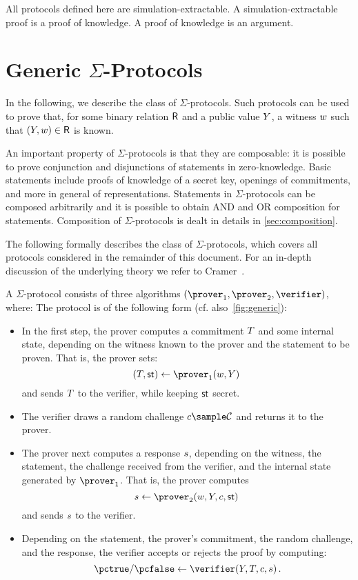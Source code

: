 \documentclass[runningheads,11pt]{article}
\begin{document}
All protocols defined here are simulation-extractable. A simulation-extractable proof is a proof of knowledge. A proof of knowledge is an argument.


\section{Generic $\Sigma$-Protocols}
In the following, we describe the class of $\Sigma$-protocols.
Such protocols can be used to prove that, for some binary relation $\mathsf{R}$ and a public value $Y$, a witness $w$ such that $(Y,w)\in\mathsf{R}$ is known.

\medskip

An important property of $\Sigma$-protocols is that they are composable: it is possible to prove conjunction and disjunctions of statements in zero-knowledge. Basic statements include proofs of knowledge of a secret key, openings of commitments, and more in general of representations.
Statements in $\Sigma$-protocols can be composed arbitrarily and it is possible to obtain \textsf{AND} and \textsf{OR} composition for statements.
Composition of $\Sigma$-protocols is dealt in details in \cref{sec:composition}.

The following formally describes the class of $\Sigma$-protocols, which covers all protocols considered in the remainder of this document.
 For an in-depth discussion of the underlying theory we refer to Cramer~\cite{cramer97}.


A $\Sigma$-protocol consists of three algorithms $(\prover_1,\prover_2,\verifier)$, where:
      The protocol is of the following form (cf. also~\cref{fig:generic}):
      \begin{itemize}
        \item
          In the first step, the prover computes a commitment $T$ and some internal state, depending on the witness known to the prover and the statement to be proven.
					That is, the prover sets:
					$$(\commitment,\st) \gets \prover_1(\witness,\statement)\,$$
					and sends $T$ to the verifier, while keeping $\mathsf{st}$ secret.
        \item
          The verifier draws a random challenge $\challenge\sample\CS$ and returns it to the prover.
        \item
          The prover next computes a response $s$, depending on the witness, the statement, the challenge received from the verifier, and the internal state generated by $\prover_1$.
					That is, the prover computes
					$$\response\gets\prover_2(\witness,\statement,\challenge,\st)\,$$
					and sends $s$ to the verifier.
        \item
          Depending on the statement, the prover's commitment, the random challenge, and the response, the verifier accepts or rejects the proof by computing:
					$$\accept/\reject \gets \verifier(\statement, \commitment,\challenge,\response)\,.$$
      \end{itemize}
\end{document}
